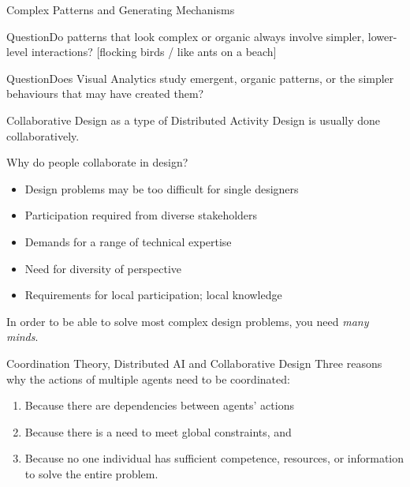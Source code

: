 \documentclass[handout]{beamer}
\begin{document}
\begin{frame}{Complex Patterns and Generating Mechanisms}
\begin{block}{Question}Do patterns that look complex or organic always involve simpler, lower-level interactions? [flocking birds / like ants on a beach]
\end{block}
\pause

\begin{block}{Question}Does Visual Analytics study emergent, organic patterns, or the simpler behaviours that may have created them?
\end{block}
\end{frame}
	
\begin{frame}{Collaborative Design as a type of Distributed Activity}
Design is usually done collaboratively.
\bigskip

Why do people collaborate in design?
\begin{itemize}
\item Design problems may be too difficult for single designers
\item Participation required from diverse stakeholders
\item Demands for a range of technical expertise
\item Need for diversity of perspective
\item Requirements for local participation; local knowledge
\end{itemize}
\bigskip
\pause
In order to be able to solve most complex design problems, you need \emph{many minds}.
\end{frame}

\begin{frame}{Coordination Theory, Distributed AI and Collaborative Design}
Three reasons why the actions of multiple agents need to be coordinated: \citep{jennings1996coordination} 
\pause
\begin{enumerate}
\item Because there are dependencies between agents' actions
\pause
\item Because there is a need to meet global constraints, and 
\pause
\item Because no one individual has sufficient competence,
resources, or information to solve the entire problem.
\end{enumerate}
\end{frame}
\end{document}
